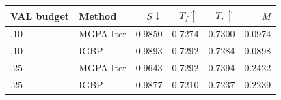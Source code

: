 \begingroup\small\setlength{\tabcolsep}{4pt}
\begin{tabular}{@{}llrrrr@{}}
\toprule
VAL budget & Method & $S\downarrow$ & $T_f\uparrow$ & $T_r\uparrow$ & $M$ \\
\midrule
.10 & MGPA-Iter & 0.9850 & 0.7274 & 0.7300 & 0.0974 \\
.10 & IGBP & 0.9893 & 0.7292 & 0.7284 & 0.0898 \\
\addlinespace[2pt]
.25 & MGPA-Iter & 0.9643 & 0.7292 & 0.7394 & 0.2422 \\
.25 & IGBP & 0.9877 & 0.7210 & 0.7237 & 0.2239 \\
\bottomrule
\end{tabular}\endgroup
